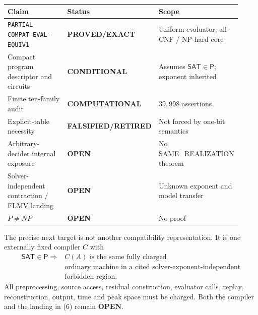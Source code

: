 \documentclass[11pt]{article}
\newcommand{\SAT}{\mathsf{SAT}}
\newcommand{\EXACT}{\textbf{PROVED/EXACT}}
\newcommand{\COMP}{\textbf{COMPUTATIONAL}}
\newcommand{\COND}{\textbf{CONDITIONAL}}
\newcommand{\OPEN}{\textbf{OPEN}}
\newcommand{\RETIRED}{\textbf{FALSIFIED/RETIRED}}
\begin{document}
\begin{center}\scriptsize
\begin{tabular}{@{}p{0.47\linewidth}p{0.21\linewidth}p{0.24\linewidth}@{}}
\toprule
Claim & Status & Scope\\ \midrule
\texttt{PARTIAL-COMPAT-EVAL-EQUIV1} & \EXACT & Uniform evaluator, all CNF / NP-hard core\\
Compact program descriptor and circuits & \COND & Assumes $\SAT\in\mathsf P$; exponent inherited\\
Finite ten-family audit & \COMP & $39{,}998$ assertions\\
Explicit-table necessity & \RETIRED & Not forced by one-bit semantics\\
Arbitrary-decider internal exposure & \OPEN & No SAME\_REALIZATION theorem\\
Solver-independent contraction / FLMV landing & \OPEN & Unknown exponent and model transfer\\
$P\ne NP$ & \OPEN & No proof\\
\bottomrule
\end{tabular}
\end{center}

The precise next target is not another compatibility representation.  It is
one externally fixed compiler $C$ with
\[
 \begin{aligned}
 \SAT\in\mathsf P\Longrightarrow{}& C(A)\text{ is the same fully charged}\\
 &\text{ordinary machine in a cited solver-exponent-independent}\\
 &\text{forbidden region}.
 \end{aligned}                                                         \tag{6}
\]
All preprocessing, source access, residual construction, evaluator calls,
replay, reconstruction, output, time and peak space must be charged.  Both
the compiler and the landing in (6) remain \OPEN.
\end{document}
